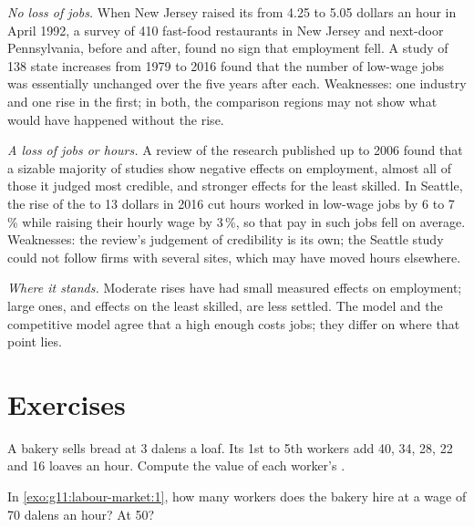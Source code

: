 \begin{debate}
\emph{No loss of jobs.} When New Jersey raised its  from 4.25 to 5.05 dollars an hour in April 1992, a survey of 410 fast-food restaurants in New Jersey and
next-door Pennsylvania, before and after, found no sign that employment fell. A study of 138 state increases from 1979 to 2016 found that the number of low-wage jobs was
essentially unchanged over the five years after each. Weaknesses: one industry and one rise in the first; in both, the comparison regions may not show what would have
happened without the rise.

\emph{A loss of jobs or hours.} A review of the research published up to 2006 found that a sizable majority of studies show negative effects on employment, almost all
of those it judged most credible, and stronger effects for the least skilled. In Seattle, the rise of the  to 13 dollars in 2016 cut hours worked in low-wage
jobs by 6 to 7\,\% while raising their hourly wage by 3\,\%, so that pay in such jobs fell on average. Weaknesses: the review's judgement of credibility is its own; the
Seattle study could not follow firms with several sites, which may have moved hours elsewhere.

\emph{Where it stands.} Moderate rises have had small measured effects on employment; large ones, and effects on the least skilled, are less settled. The  model
and the competitive model agree that a high enough  costs jobs; they differ on where that point lies.
\end{debate}

\section{Exercises}

\begin{exercise}[$\star$]\label{exo:g11:labour-market:1}
A bakery sells bread at 3 dalens a loaf. Its 1st to 5th workers add 40, 34, 28, 22 and 16 loaves an hour. Compute the value of each worker's .
\end{exercise}

\begin{exercise}[$\star$]\label{exo:g11:labour-market:2}
In \cref{exo:g11:labour-market:1}, how many workers does the bakery hire at a wage of 70 dalens an hour? At 50?
\end{exercise}

